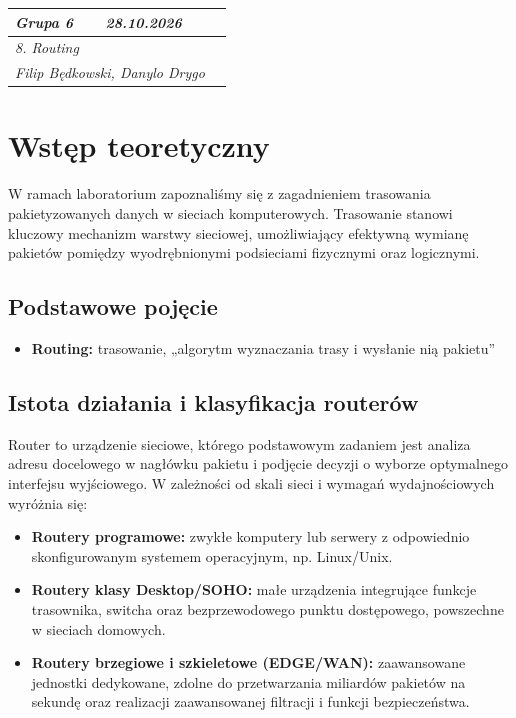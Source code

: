 \documentclass[12pt, a4paper]{article}
\begin{document}
\begin{table}[h!]
\centering
\renewcommand{\arraystretch}{2.5}
\begin{tabularx}{\textwidth}{|p{3cm}|X|p{4.5cm}|}
\hline
\textit{Grupa 6} & \textit{28.10.2026} & \textit{} \\ \hline
\multicolumn{3}{|l|}{\textit{8. Routing}} \\ \hline
\multicolumn{2}{|l|}{\textit{Filip Będkowski, Danylo Drygo}} & \textit{} \\ \hline
\end{tabularx}
\end{table}


\section{Wstęp teoretyczny}

W ramach laboratorium zapoznaliśmy się z zagadnieniem trasowania pakietyzowanych danych w sieciach komputerowych. Trasowanie stanowi kluczowy mechanizm warstwy sieciowej, umożliwiający efektywną wymianę pakietów pomiędzy wyodrębnionymi podsieciami fizycznymi oraz logicznymi.

\subsection{Podstawowe pojęcie}
\begin{itemize}
    \item \textbf{Routing:} trasowanie, „algorytm wyznaczania trasy i wysłanie nią pakietu”
\end{itemize}

\subsection{Istota działania i klasyfikacja routerów}
Router to urządzenie sieciowe, którego podstawowym zadaniem jest analiza adresu docelowego w nagłówku pakietu i podjęcie decyzji o wyborze optymalnego interfejsu wyjściowego. W zależności od skali sieci i wymagań wydajnościowych wyróżnia się:
\begin{itemize}
    \item \textbf{Routery programowe:} zwykłe komputery lub serwery z odpowiednio skonfigurowanym systemem operacyjnym, np. Linux/Unix.
    \item \textbf{Routery klasy Desktop/SOHO:} małe urządzenia integrujące funkcje trasownika, switcha oraz bezprzewodowego punktu dostępowego, powszechne w sieciach domowych.
    \item \textbf{Routery brzegiowe i szkieletowe (EDGE/WAN):} zaawansowane jednostki dedykowane, zdolne do przetwarzania miliardów pakietów na sekundę oraz realizacji zaawansowanej filtracji i funkcji bezpieczeństwa.
\end{itemize}
\end{document}
